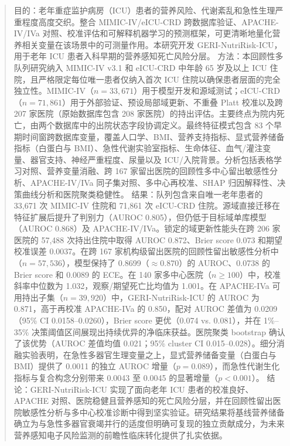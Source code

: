 \documentclass[11pt]{ctexart}
\begin{document}
\begin{abstract}
目的：老年重症监护病房（ICU）患者的营养风险、代谢紊乱和急性生理严重程度高度交织。整合 MIMIC-IV/eICU-CRD 跨数据库验证、APACHE-IV/IVa 对照、校准评估和可解释机器学习的预测框架，可更清晰地量化营养相关变量在该场景中的可测量作用。本研究开发 GERI-NutriRisk-ICU，用于老年 ICU 患者入科早期的营养感知死亡风险分层。
方法：本回顾性多队列研究纳入 MIMIC-IV v3.1 和 eICU-CRD 中年龄 65 岁及以上 ICU 住院，且严格限定每位唯一患者仅纳入首次 ICU 住院以确保患者层面的完全独立性。MIMIC-IV（$n=33,671$）用于模型开发和源域测试；eICU-CRD（$n=71,861$）用于外部验证、预设局部域更新、不重叠 Platt 校准以及跨 207 家医院（原始数据库包含 208 家医院）的持出评估。主要终点为院内死亡，由两个数据库中的出院状态字段协调定义。最终特征模式包含 83 个早期时间窗跨数据库变量，覆盖人口学、BMI、营养支持指标、显式营养储备指标（白蛋白与 BMI）、急性代谢实验室指标、生命体征、血气/灌注变量、器官支持、神经严重程度、尿量以及 ICU/入院背景。分析包括表格学习对照、营养变量消融、跨 167 家留出医院的回顾性多中心留出敏感性分析、APACHE-IV/IVa 同子集对照、多中心再校准、SHAP 归因解释性、决策曲线分析和医院聚类稳健性。
结果：队列包含来自唯一老年患者的 33,671 次 MIMIC-IV 住院和 71,861 次 eICU-CRD 住院。源域直接迁移在特征扩展后提升了判别力（AUROC 0.805），但仍低于目标域单库模型（AUROC 0.868）及 APACHE-IV/IVa。锁定的域更新性能头在跨 206 家医院的 57,488 次持出住院中取得 AUROC 0.872、Brier score 0.073 和期望校准误差 0.0037。在跨 167 家机构级留出医院的回顾性留出敏感性分析中（$n=57,536$），模型保持了 0.8699（$\approx 0.870$）的 AUROC、0.0738 的 Brier score 和 0.0089 的 ECE。在 140 家多中心医院（$n\ge 100$）中，校准斜率中位数为 1.032，观察/期望死亡比均值为 1.001。在 APACHE-IVa 可用持出子集（$n=39,920$）中，GERI-NutriRisk-ICU 的 AUROC 为 0.871，高于再校准 APACHE-IVa 的 0.850，配对 AUROC 差值为 0.0209（95\% CI 0.0158--0.0260），Brier score 更优（0.074 vs. 0.081），并在 1\%--35\% 决策阈值区间展现出持续优异的净临床获益。医院聚类 bootstrap 确认了该优势（AUROC 差值均值 0.021；95\% cluster CI 0.015--0.028）。细分消融实验表明，在急性多器官生理变量之上，显式营养储备变量（白蛋白与 BMI）提供了 0.0011 的独立 AUROC 增量（$p=0.089$），而急性代谢生化指标与复合构念分别带来 0.0043 至 0.0045 的显著增量（$p<0.001$）。
结论：GERI-NutriRisk-ICU 实现了面向老年 ICU 患者的校准良好、APACHE 对照、医院稳健且营养感知的死亡风险分层，并在回顾性留出医院敏感性分析与多中心校准诊断中得到坚实验证。研究结果将基线营养储备确立为与急性多器官衰竭并行的适度但明确可复现的独立贡献成分，为未来营养感知电子风险监测的前瞻性临床转化提供了扎实依据。
\end{abstract}
\end{document}
